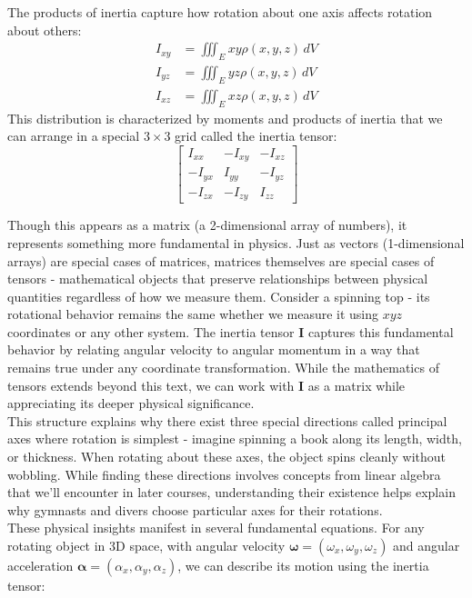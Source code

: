 \noindent The products of inertia capture how rotation about one axis affects rotation about others:
\begin{align*}
I_{xy} &= \iiint_E xy\rho(x,y,z)\,dV \\
I_{yz} &= \iiint_E yz\rho(x,y,z)\,dV \\
I_{xz} &= \iiint_E xz\rho(x,y,z)\,dV
\end{align*}
\noindent This distribution is characterized by moments and products of inertia that we can arrange in a special $3 \times 3$ grid called the inertia tensor:
\[
\begin{bmatrix}
I_{xx} & -I_{xy} & -I_{xz} \\
-I_{yx} & I_{yy} & -I_{yz} \\
-I_{zx} & -I_{zy} & I_{zz}
\end{bmatrix}
\]

\noindent Though this appears as a matrix (a 2-dimensional array of numbers), it represents something more fundamental in physics. Just as vectors (1-dimensional arrays) are special cases of matrices, matrices themselves are special cases of tensors - mathematical objects that preserve relationships between physical quantities regardless of how we measure them. Consider a spinning top - its rotational behavior remains the same whether we measure it using $xyz$ coordinates or any other system. The inertia tensor $\mathbf{I}$ captures this fundamental behavior by relating angular velocity to angular momentum in a way that remains true under any coordinate transformation. While the mathematics of tensors extends beyond this text, we can work with $\mathbf{I}$ as a matrix while appreciating its deeper physical significance. \\

\noindent This structure explains why there exist three special directions called principal axes where rotation is simplest - imagine spinning a book along its length, width, or thickness. When rotating about these axes, the object spins cleanly without wobbling. While finding these directions involves concepts from linear algebra that we'll encounter in later courses, understanding their existence helps explain why gymnasts and divers choose particular axes for their rotations.\\

\noindent These physical insights manifest in several fundamental equations. For any rotating object in 3D space, with angular velocity $\boldsymbol{\omega} = (\omega_x, \omega_y, \omega_z)$ and angular acceleration $\boldsymbol{\alpha} = (\alpha_x, \alpha_y, \alpha_z)$, we can describe its motion using the inertia tensor:

